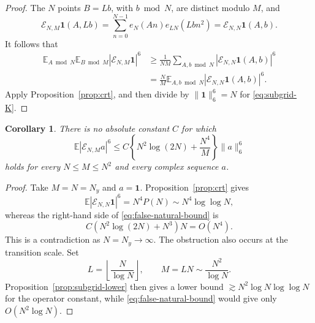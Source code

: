 \documentclass[11pt, twoside]{article}
\numberwithin{equation}{section}
\newtheorem{corollary}[theorem]{Corollary}
\theoremstyle{definition}
\newcommand{\E}{\mathbb E}
\newcommand{\cE}{\mathcal E}
\newcommand{\ind}{\mathbf 1}
\begin{document}
\begin{proof}
The $N$ points $B=Lb$, with $b\bmod N$, are distinct modulo $M$, and
$$
\cE_{N,M}\ind(A,Lb)
=\sum_{n=0}^{N-1}e_N(An)e_{LN}(Lbn^2)
=\cE_{N,N}\ind(A,b).
$$
It follows that
$$
\begin{aligned}
\E_{A\bmod N}\E_{B\bmod M}|\cE_{N,M}\ind|^6
&\geq\frac1{NM}\sum_{A,b\bmod N}|\cE_{N,N}\ind(A,b)|^6\\
&=\frac NM\E_{A,b\bmod N}|\cE_{N,N}\ind(A,b)|^6.
\end{aligned}
$$
Apply Proposition~\ref{prop:crt}, and then divide by
$\|\ind\|_6^6=N$ for \eqref{eq:subgrid-K}.
\end{proof}

\begin{corollary}
\label{cor:no-arithmetic-factor}
There is no absolute constant $C$ for which
\begin{equation}\label{eq:false-natural-bound}
\E|\cE_{N,M}a|^6
\leq
C\left\{N^2\log(2N)+\frac{N^4}{M}\right\}\|a\|_6^6
\end{equation}
holds for every $N\leq M\leq N^2$ and every complex sequence $a$.
\end{corollary}

\begin{proof}
Take $M=N=N_y$ and $a=\ind$.  Proposition~\ref{prop:crt} gives
$$
\E|\cE_{N,N}\ind|^6
=N^4P(N)\sim N^4\log\log N,
$$
whereas the right-hand side of \eqref{eq:false-natural-bound} is
$$
C\left(N^2\log(2N)+N^3\right)N=O(N^4).
$$
This is a contradiction as $N=N_y\to\infty$.
The obstruction also occurs at the transition scale.  Set
$$
L=\left\lfloor\frac{N}{\log N}\right\rfloor,
\qquad
M=LN\sim\frac{N^2}{\log N}.
$$
Proposition~\ref{prop:subgrid-lower} then gives a lower bound
$\gtrsim N^2\log N\log\log N$ for the operator constant, while
\eqref{eq:false-natural-bound} would give only $O(N^2\log N)$.
\end{proof}
\end{document}

